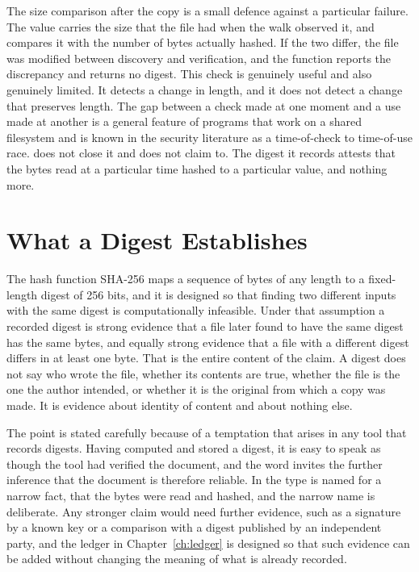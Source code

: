 The size comparison after the copy is a small defence against a particular failure. The  value carries the size that the file had when the walk observed it, and  compares it with the number of bytes actually hashed. If the two differ, the file was modified between discovery and verification, and the function reports the discrepancy and returns no digest. This check is genuinely useful and also genuinely limited. It detects a change in length, and it does not detect a change that preserves length. The gap between a check made at one moment and a use made at another is a general feature of programs that work on a shared filesystem and is known in the security literature as a time-of-check to time-of-use race. \golab{} does not close it and does not claim to. The digest it records attests that the bytes read at a particular time hashed to a particular value, and nothing more.

\section{What a Digest Establishes}

The hash function SHA-256 maps a sequence of bytes of any length to a fixed-length digest of 256 bits, and it is designed so that finding two different inputs with the same digest is computationally infeasible. Under that assumption a recorded digest is strong evidence that a file later found to have the same digest has the same bytes, and equally strong evidence that a file with a different digest differs in at least one byte. That is the entire content of the claim. A digest does not say who wrote the file, whether its contents are true, whether the file is the one the author intended, or whether it is the original from which a copy was made. It is evidence about identity of content and about nothing else.

The point is stated carefully because of a temptation that arises in any tool that records digests. Having computed and stored a digest, it is easy to speak as though the tool had verified the document, and the word invites the further inference that the document is therefore reliable. In \golab{} the type  is named for a narrow fact, that the bytes were read and hashed, and the narrow name is deliberate. Any stronger claim would need further evidence, such as a signature by a known key or a comparison with a digest published by an independent party, and the ledger in Chapter~\ref{ch:ledger} is designed so that such evidence can be added without changing the meaning of what is already recorded.

